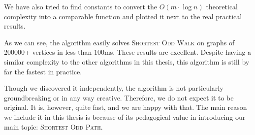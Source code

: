 We have also tried to find constants to convert the $O(m \cdot \log n)$ theoretical complexity into a comparable function and plotted it next to the real practical results.

\begin{center}
        
\end{center}

As we can see, the algorithm easily solves \textsc{Shortest Odd Walk} on graphs of 200000+ vertices in less than 100ms. These results are excellent. Despite having a similar complexity to the other algorithms in this thesis, this algorithm is still by far the fastest in practice.

Though we discovered it independently, the algorithm is not particularly groundbreaking or in any way creative. Therefore, we do not expect it to be original. It is, however, quite fast, and we are happy with that. The main reason we include it in this thesis is because of its pedagogical value in introducing our main topic: \textsc{Shortest Odd Path}. 
